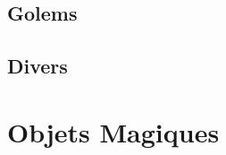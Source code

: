 \documentclass{dd}
\begin{document}
\section{Golems}









\section{Divers}
%

\chapter{Objets Magiques}
\end{document}
